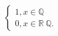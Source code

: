 \documentclass[preview]{standalone}
\begin{document}
\begin{align*}
\begin{cases} 1, x \in \mathbb{Q} \\0, x \in  \mathbb{R} \ \mathbb{Q}. \end{cases}
\end{align*}
\end{document}
